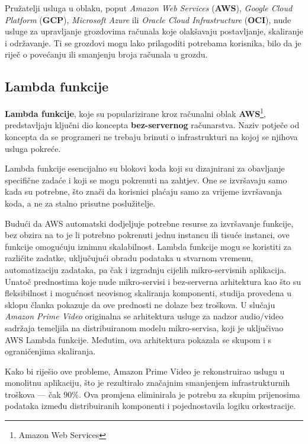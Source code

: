 \documentclass[times, utf8, diplomski]{fer}
\begin{document}
Pružatelji usluga u oblaku, poput \emph{Amazon Web Services} (\textbf{AWS}), \emph{Google Cloud Platform} (\textbf{GCP}), \emph{Microsoft Azure} ili \emph{Oracle Cloud Infrastructure} (\textbf{OCI}), nude usluge za upravljanje grozdovima računala koje olakšavaju postavljanje, skaliranje i održavanje. Ti se grozdovi mogu lako prilagoditi potrebama korisnika, bilo da je riječ o povećanju ili smanjenju broja računala u grozdu.

\subsection{Lambda funkcije}

\textbf{Lambda funkcije}, koje su popularizirane kroz računalni oblak \textbf{AWS}\footnote{Amazon Web Services}, predstavljaju ključni dio koncepta \textbf{bez-servernog}  računarstva. Naziv potječe od koncepta da se programeri ne trebaju brinuti o infrastrukturi na kojoj se njihova usluga pokreće.

Lambda funkcije esencijalno su blokovi koda koji su dizajnirani za obavljanje specifične zadaće i koji se mogu pokrenuti na zahtjev. One se izvršavaju samo kada su potrebne, što znači da korisnici plaćaju samo za vrijeme izvršavanja koda, a ne za stalno prisutne poslužitelje.

Budući da AWS automatski dodjeljuje potrebne resurse za izvršavanje funkcije, bez obzira na to je li potrebno pokrenuti jednu instancu ili tisuće instanci, ove funkcije omogućuju iznimnu skalabilnost. Lambda funkcije mogu se koristiti za različite zadatke, uključujući obradu podataka u stvarnom vremenu, automatizaciju zadataka, pa čak i izgradnju cijelih mikro-servisnih aplikacija. \\

Unatoč prednostima koje nude mikro-servisi i bez-serverna  arhitektura kao što su fleksibilnost i mogućnost neovisnog skaliranja komponenti, studija provedena u sklopu članka \citet{kolny_scaling_2023} pokazuje da ove prednosti ne dolaze bez troškova. U slučaju \emph{Amazon Prime Video} originalna se arhitektura usluge za nadzor audio/video sadržaja temeljila na distribuiranom modelu mikro-servisa, koji je uključivao AWS Lambda funkcije. Međutim, ova arhitektura pokazala se skupom i s ograničenjima skaliranja.

Kako bi riješio ove probleme, Amazon Prime Video je rekonstruirao uslugu u monolitnu aplikaciju, što je rezultiralo značajnim smanjenjem infrastrukturnih troškova --- čak $90\%$. Ova promjena eliminirala je potrebu za skupim prijenosima podataka između distribuiranih komponenti i pojednostavila logiku orkestracije.
\end{document}

